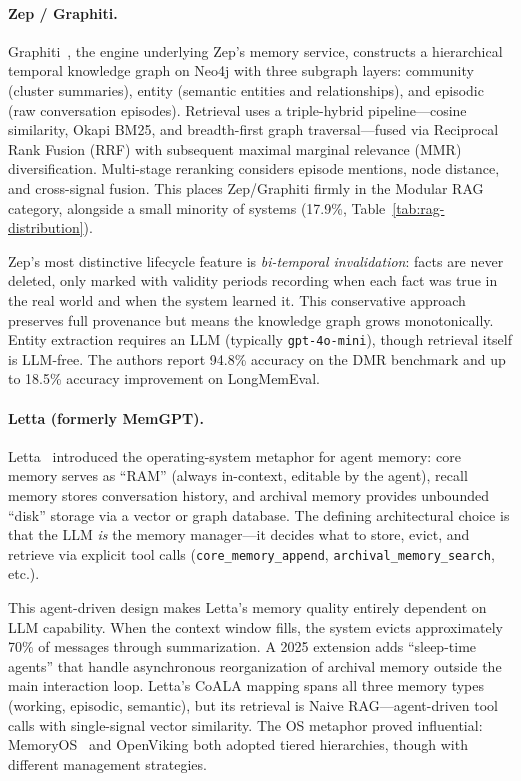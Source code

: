 \paragraph{Zep / Graphiti.}
Graphiti~\cite{dempsey2025graphiti}, the engine underlying Zep's memory
service, constructs a hierarchical temporal knowledge graph on Neo4j
with three subgraph layers: community (cluster summaries), entity
(semantic entities and relationships), and episodic (raw conversation
episodes). Retrieval uses a triple-hybrid pipeline---cosine similarity,
Okapi BM25, and breadth-first graph traversal---fused via Reciprocal
Rank Fusion (RRF) with subsequent maximal marginal relevance (MMR)
diversification. Multi-stage reranking considers episode mentions, node
distance, and cross-signal fusion. This places Zep/Graphiti firmly in
the Modular RAG category, alongside a small minority of systems
(17.9\%, Table~\ref{tab:rag-distribution}).

Zep's most distinctive lifecycle feature is \emph{bi-temporal
invalidation}: facts are never deleted, only marked with validity
periods recording when each fact was true in the real world and when
the system learned it. This conservative approach preserves full
provenance but means the knowledge graph grows monotonically. Entity
extraction requires an LLM (typically \texttt{gpt-4o-mini}), though
retrieval itself is LLM-free. The authors report 94.8\% accuracy on
the DMR benchmark and up to 18.5\% accuracy improvement on
LongMemEval.

\paragraph{Letta (formerly MemGPT).}
Letta~\cite{packer2023memgpt} introduced the operating-system metaphor
for agent memory: core memory serves as ``RAM'' (always in-context,
editable by the agent), recall memory stores conversation history, and
archival memory provides unbounded ``disk'' storage via a vector or
graph database. The defining architectural choice is that the LLM
\emph{is} the memory manager---it decides what to store, evict, and
retrieve via explicit tool calls (\texttt{core\_memory\_append},
\texttt{archival\_memory\_search}, etc.).

This agent-driven design makes Letta's memory quality entirely
dependent on LLM capability. When the context window fills, the
system evicts approximately 70\% of messages through summarization.
A 2025 extension adds ``sleep-time agents'' that handle asynchronous
reorganization of archival memory outside the main interaction loop.
Letta's CoALA mapping spans all three memory types (working, episodic,
semantic), but its retrieval is Naive RAG---agent-driven tool calls
with single-signal vector similarity. The OS metaphor proved
influential: MemoryOS~\cite{kang2025memoryos} and OpenViking both
adopted tiered hierarchies, though with different management
strategies.

